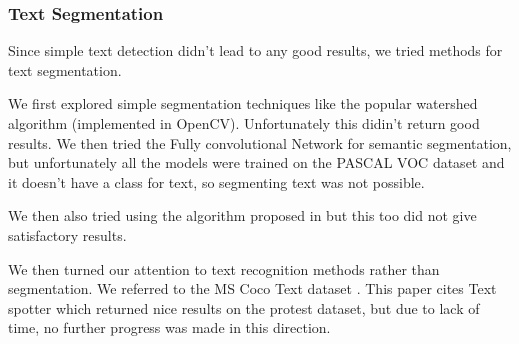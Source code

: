 \documentclass{article}
\begin{document}
\subsubsection{Text Segmentation}
Since simple text detection didn't lead to any good results, we tried methods for text segmentation.

We first explored simple segmentation techniques like the popular watershed algorithm (implemented in OpenCV)\cite{opecv}. Unfortunately this didin't return good results. We then tried the Fully convolutional Network for semantic segmentation\cite{Long_2015_CVPR}, but unfortunately all the models were trained on the PASCAL VOC dataset \cite{Everingham10} and it doesn't have a class for text, so segmenting text was not possible.

We then also tried using the algorithm proposed in \cite{Felzenszwalb:2004:EGI:981793.981796} but this too did not give satisfactory results.

We then turned our attention to text recognition methods rather than segmentation. We referred to the MS Coco Text dataset \cite{veit2016cocotext}. This paper cites Text spotter\cite{Gupta16} which returned nice results on the protest dataset, but due to lack of time, no further progress was made in this direction.






\end{document}
